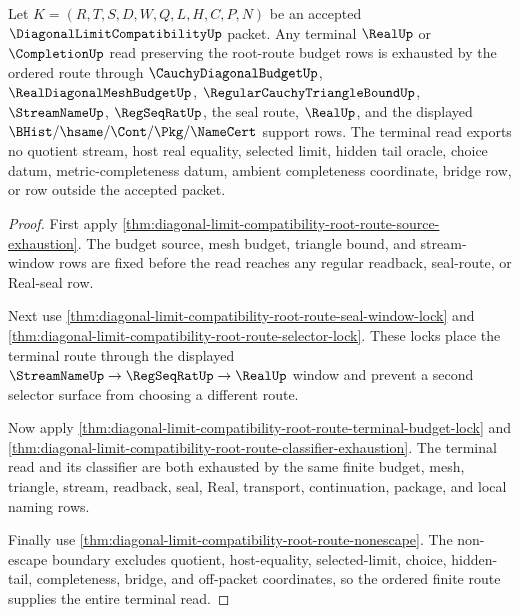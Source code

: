 \begin{theorem}
\label{thm:diagonal-limit-root-route-budget-terminal-exhaustion}
Let $K=(R,T,S,D,W,Q,L,H,C,P,N)$ be an accepted
$\DiagonalLimitCompatibilityUp$ packet. Any terminal $\RealUp$ or
$\CompletionUp$ read preserving the root-route budget rows is exhausted by the
ordered route through $\CauchyDiagonalBudgetUp$, $\RealDiagonalMeshBudgetUp$,
$\RegularCauchyTriangleBoundUp$, $\StreamNameUp$, $\RegSeqRatUp$, the seal
route, $\RealUp$, and the displayed $\BHist/\hsame/\Cont/\Pkg/\NameCert$
support rows. The terminal read exports no quotient stream, host real equality,
selected limit, hidden tail oracle, choice datum, metric-completeness datum,
ambient completeness coordinate, bridge row, or row outside the accepted
packet.
\end{theorem}
\begin{proof}
First apply
\autoref{thm:diagonal-limit-compatibility-root-route-source-exhaustion}. The
budget source, mesh budget, triangle bound, and stream-window rows are fixed
before the read reaches any regular readback, seal-route, or Real-seal row.

Next use
\autoref{thm:diagonal-limit-compatibility-root-route-seal-window-lock} and
\autoref{thm:diagonal-limit-compatibility-root-route-selector-lock}. These
locks place the terminal route through the displayed
$\StreamNameUp \to \RegSeqRatUp \to \RealUp$ window and prevent a second
selector surface from choosing a different route.

Now apply
\autoref{thm:diagonal-limit-compatibility-root-route-terminal-budget-lock} and
\autoref{thm:diagonal-limit-compatibility-root-route-classifier-exhaustion}.
The terminal read and its classifier are both exhausted by the same finite
budget, mesh, triangle, stream, readback, seal, Real, transport, continuation,
package, and local naming rows.

Finally use \autoref{thm:diagonal-limit-compatibility-root-route-nonescape}.
The non-escape boundary excludes quotient, host-equality, selected-limit,
choice, hidden-tail, completeness, bridge, and off-packet coordinates, so the
ordered finite route supplies the entire terminal read.
\end{proof}

